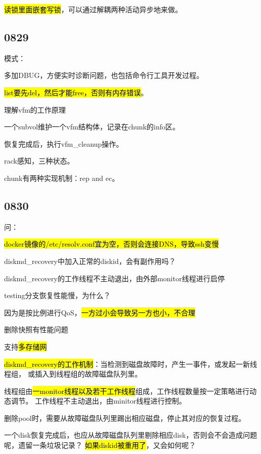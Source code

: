 \hl{读锁里面嵌套写锁}，可以通过解耦两种活动异步地来做。

\subsection{0829}

模式：
\begin{enumbox}
\item 多加DBUG，方便实时诊断问题，也包括命令行工具开发过程。
\item \hl{list要先del，然后才能free，否则有内存错误}。
\end{enumbox}

理解vfm的工作原理

一个subvol维护一个vfm结构体，记录在chunk的info区。

恢复完成后，执行vfm\_cleanup操作。

rack感知，三种状态。

chunk有两种实现机制：rep and ec。

\subsection{0830}

问：
\begin{enumbox}
\item \hl{docker镜像的/etc/resolv.conf宜为空，否则会连接DNS，导致ssh变慢}
\item diskmd\_recovery中加入正常的diskid，会有副作用吗？
\item diskmd\_recovery的工作线程不主动退出，由外部monitor线程进行启停
\item testing分支恢复性能慢，为什么？
\item 因为是按比例进行QoS，\hl{一方过小会导致另一方也小，不合理}
\item 删除快照有性能问题
\item 支持\hl{多存储网}
\end{enumbox}

\hl{diskmd\_recovery的工作机制}：当检测到磁盘故障时，产生一事件，或发起一新线程组，
或插入到线程组的故障磁盘队列里。

线程组由\hl{一monitor线程以及若干工作线程}组成，工作线程数量按一定策略进行动态调节。
工作线程不主动退出，由minitor线程进行控制。

删除pool时，需要从故障磁盘队列里踢出相应磁盘，停止其对应的恢复过程。

一个disk恢复完成后，也应从故障磁盘队列里剔除相应disk，否则会不会造成问题呢，遗留一条垃圾记录？
\hl{如果diskid被重用了}，又会如何呢？

